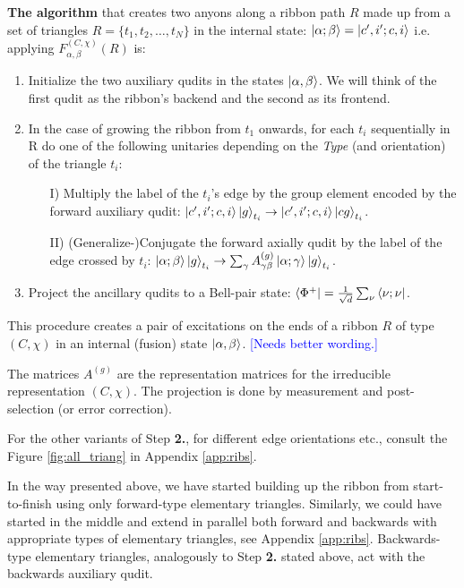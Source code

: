 \documentclass[two column]{article}
\newcommand{\jovan}[1]{\textcolor{blue}{[#1]}}
\begin{document}
\textbf{The algorithm} that creates two anyons along a ribbon path $R$ made up from a set of triangles $R = \{t_1, t_2, \ldots, t_N\}$ in the internal state: $\ket{\alpha; \beta} = \ket{c', i'; c, i}$ i.e. applying $F_{\alpha, \beta}^{(C,\chi)}(R)$ is:\begin{enumerate}
    \item Initialize the two auxiliary qudits in the states $\ket{\alpha, \beta}$. We will think of the first qudit as the ribbon's backend and the second as its frontend.
    \item In the case of growing the ribbon from $t_1$ onwards, for each $t_i$ sequentially in R do one of the following unitaries depending on the \textit{Type} (and orientation) of the triangle $t_i$: \begin{itemize}
        \item[I)] Multiply the label of the $t_i$'s edge by the group element encoded by the forward auxiliary qudit: $\ket{c', i';c, i}\ket{g}_{t_i} \rightarrow \ket{c', i';c, i}\ket{cg}_{t_i}$.
        \item[II)] (Generalize-)Conjugate the forward axially qudit by the label of the edge crossed by $t_i$: $\ket{\alpha;\beta}\ket{g}_{t_i} \rightarrow \sum_\gamma A_{\gamma\beta}^{(g)}\ket{\alpha;\gamma}\ket{g}_{t_i}$.
    \end{itemize}
    \item Project the ancillary qudits to a Bell-pair state: $\bra{\Phi^+} = \frac{1}{\sqrt{d}}\sum_\nu \bra{\nu; \nu}$.
\end{enumerate}

This procedure creates a pair of excitations on the ends of a ribbon $R$ of type $(C, \chi)$ in an internal (fusion) state $\ket{\alpha, \beta}$. \jovan{Needs better wording.}

The matrices $A^{(g)}$ are the representation matrices for the irreducible representation $(C, \chi)$. The projection is done by measurement and post-selection (or error correction).

For the other variants of Step \textbf{2.}, for different edge orientations etc., consult the Figure \ref{fig:all_triang} in Appendix \ref{app:ribs}. 

In the way presented above, we have started building up the ribbon from start-to-finish using only forward-type elementary triangles. Similarly, we could have started in the middle and extend in parallel both forward and backwards with appropriate types of elementary triangles, see Appendix \ref{app:ribs}. Backwards-type elementary triangles, analogously to Step \textbf{2.} stated above, act with the backwards auxiliary qudit.
\end{document}
